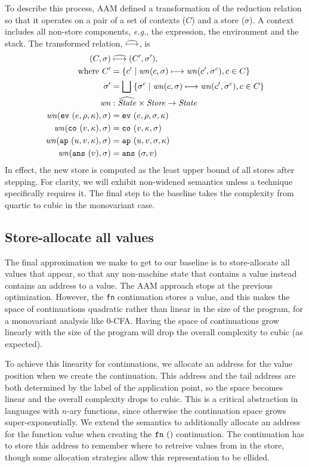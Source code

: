 \documentclass[preprint,onecolumn,9pt]{sigplanconf} %
\begin{document}
To describe this process, AAM defined a transformation of the reduction relation so that it operates on
a pair of a set of contexts ($C$) and a store ($\sigma$).
%
A context includes all non-store components, \emph{e.g.}, the expression, the environment and the stack.
%
The transformed relation, $\widehat{\mathbin{\longmapsto}}$, is
%
\begin{align*}
(C, \sigma) &\mathrel{\widehat{\mathbin{\longmapsto}}} (C', \sigma'), \\
\mbox{where } C' &= \{c' \mid \mathit{wn}(c, \sigma) \mathrel{\mathbin{\longmapsto}} \mathit{wn}(c', \sigma^c), c \in C\} \\
              \sigma' &= \bigsqcup\; \{\sigma^c \mid \mathit{wn}(c,\sigma)\mathrel{\mathbin{\longmapsto}} \mathit{wn}(c', \sigma^c), c \in C\} \\
\mathit{wn} &: \widehat{\mathit{State}} \times \mathit{Store} \to \mathit{State} \\
\mathit{wn}({\tt ev}{\ }({e, \rho, \kappa}), \sigma) &= {\tt ev}{\ }({e, \rho, \sigma, \kappa}) \\
\mathit{wn}({\tt co}{\ }({v, \kappa}), \sigma) &= {\tt co}{\ }({v, \kappa, \sigma}) \\
\mathit{wn}({\tt ap}{\ }({u, v, \kappa}), \sigma) &= {\tt ap}{\ }({u, v, \sigma, \kappa}) \\
\mathit{wn}({\tt ans}{\ }({v}), \sigma) &= {\tt ans}{\ }({\sigma, v})
\end{align*}
%
In effect, the new store is computed as the least upper bound of all
stores after stepping. For clarity, we will exhibit non-widened
semantics unless a technique specifically requires it. The final step
to the baseline takes the complexity from quartic to cubic in the
monovariant case.

\subsection{Store-allocate all values}
\label{sec:baselineeval}

The final approximation we make to get to our baseline is to
store-allocate all values that appear, so that any non-machine state
that contains a value instead contains an address to a value.  The AAM
approach stops at the previous optimization.  However, the {\tt fn}
continuation stores a value, and this makes the space of continuations
quadratic rather than linear in the size of the program, for a
monovariant analysis like 0-CFA.  Having the space of continuations
grow linearly with the size of the program will drop the overall
complexity to cubic (as expected).

To achieve this linearity for continuations, we allocate an address
for the value position when we create the continuation.  This address
and the tail address are both determined by the label of the
application point, so the space becomes linear and the overall
complexity drops to cubic.  This is a critical abstraction in
languages with $n$-ary functions, since otherwise the continuation
space grows super-exponentially. We extend the semantics to
additionally allocate an address for the function value when creating
the ${\tt fn}{\ }({})$ continuation. The continuation has to store this address
to remember where to retreive values from in the store, though some allocation
strategies allow this representation to be ellided.
\end{document}

